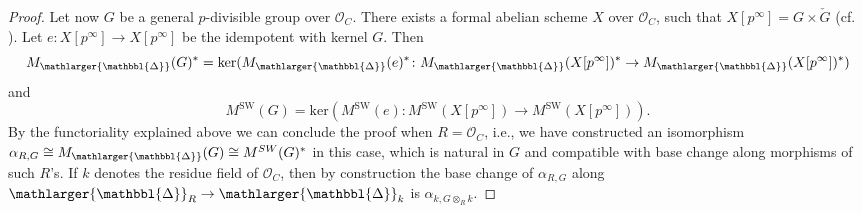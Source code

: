 \documentclass{amsart}
\newcommand{\prism}{{\mathlarger{\mathbbl{\Delta}}}}
\theoremstyle{plain}
\theoremstyle{definition}
\newcommand{\red}[1]{{\color{black} #1}}
\begin{document}
\begin{proof}
Let now $G$ be a general $p$-divisible group over $\mathcal{O}_C$. There exists a formal abelian scheme $X$ over $\mathcal{O}_C$, such that $X[p^{\infty}]=G \times \check{G}$ (cf. \cite[Proposition 14.8.4]{scholze2020berkeley}). Let $e\colon X[p^\infty]\to X[p^\infty]$ be the idempotent with kernel $G$. Then
  $$
  M_\prism(G)^{\ast}=\mathrm{ker}(M_\prism(e)^{\ast}\colon M_\prism(X[p^\infty])^{\ast}\to M_\prism(X[p^\infty])^{\ast})
  $$
  and
  $$
  M^{\mathrm{SW}}(G)=\mathrm{ker}(M^{\mathrm{SW}}(e) \colon M^{\mathrm{SW}}(X[p^\infty]) \to M^{\mathrm{SW}}(X[p^\infty])). 
  $$
  By the functoriality explained above we can conclude \red{the proof when $R=\mathcal{O}_C$, i.e., we have constructed an isomorphism $\alpha_{R,G}\cong M_\prism(G)\cong M^{SW}(G)^\ast$ in this case, which is natural in $G$ and compatible with base change along morphisms of such $R$'s. If $k$ denotes the residue field of $\mathcal{O}_C$, then by construction the base change of $\alpha_{R,G}$ along $\prism_R\to \prism_k$ is $\alpha_{k,G\otimes_R k}$.} 


\end{proof}
\end{document}
